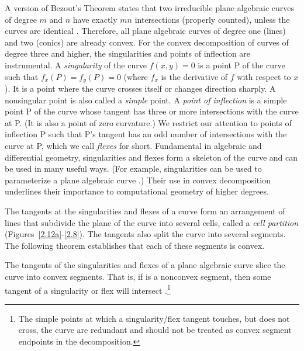 A version of Bezout's Theorem states that two irreducible plane algebraic curves 
of degree $m$ and $n$ have exactly $mn$ intersections (properly counted),
unless the curves are identical \cite{walker}.
Therefore, all plane algebraic curves of degree one (lines) and two (conics) 
are already convex.
For the convex decomposition of curves of degree three and higher, the 
singularities and points of inflection are instrumental.
A {\em singularity} of the curve $f(x,y)=0$ is a point P of the curve
such that $f_{x}(P) = f_{y}(P) = 0$ (where $f_{x}$ is the derivative of $f$ with
respect to $x$).
It is a point where the curve crosses itself or changes direction sharply.
A nonsingular point is also called a {\em simple} point.
A {\em point of inflection} is a simple point P of the curve
whose tangent has three or more intersections with the curve at P.  
(It is also a point of zero curvature.)
We restrict our attention to points of inflection P such that P's tangent 
has an odd number of intersections with the curve at P, which we call
\label{restriction}
{\em flexes} for short.
Fundamental in algebraic and differential geometry, singularities and flexes
form a skeleton of the curve and can be used in many useful ways.
(For example, singularities can be used to parameterize a plane algebraic curve 
\cite{abba3}.)
Their use in convex decomposition underlines their importance to
computational geometry of higher degrees.

The tangents at the singularities and flexes of a curve form an arrangement 
of lines that subdivide the plane of the curve into several cells,
called a {\em cell partition} (Figures~\ref{2.12a}-\ref{2.8}).
The tangents also split the curve into several segments.
The following theorem establishes that each of these segments is convex.


\begin{theorem}
\label{deke}
The tangents of the singularities and flexes of a plane algebraic curve slice
the curve into convex segments.  That is, if  is a nonconvex 
segment, then some tangent of a singularity or flex will intersect 
.\footnote{The simple points at which a singularity/flex 
	tangent touches, but does not cross, the curve are redundant and should 
	not be treated as convex segment endpoints in the decomposition.}
\end{theorem}
\ifFull
{}

